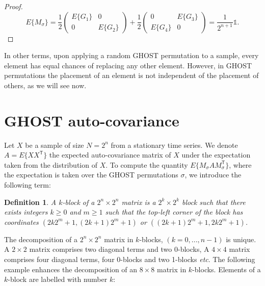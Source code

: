 \documentclass[12pt]{article}
\newtheorem{definition}{Definition}
\begin{document}
\begin{proof}
    \begin{equation*}
      E\{ M_\sigma \} = 
      \frac{1}{2} \left( \begin{array}{cc}
        E\{ G_1 \} & 0 \\
        0   & E \{ G_2 \}
      \end{array} \right) +
      \frac{1}{2} \left( \begin{array}{cc}
        0 & E \{ G_3 \} \\
        E \{ G_4 \} & 0
      \end{array} \right) = \frac{1}{2^{n+1}} \mathbb{1}.
    \end{equation*}

  \end{proof}

  In other terms, upon applying a random GHOST permutation to a
  sample, every element has equal chances of replacing any other
  element. However, in GHOST permutations the placement of an element
  is not independent of the placement of others, as we will see now.

  \section{GHOST auto-covariance}

  Let $X$ be a sample of size $N = 2^n$ from a stationary time series.
  We denote $A = E\{XX^\mathsf{T}\}$ the expected auto-covariance matrix
  of $X$ under the expectation taken from the distribution of $X$.
  To compute the quantity $E\{M_\sigma A M_\sigma^\mathsf{T}\}$,
  where the expectation is taken over the GHOST permutations
  $\sigma$, we introduce the following term:

  \begin{definition}\label{kblocks}
    A $k$-block of a $2^n \times 2^n$ matrix is a $2^k \times 2^k$ block
    such that there exists integers $k \geq0$ and $m \geq 1$ such that
    the top-left corner of the block has coordinates
    $(2k2^m+1, (2k+1)2^m+1)$ or $((2k+1)2^m+1, 2k2^m+1)$.
  \end{definition}

  The decomposition of a  $2^n \times 2^n$ matrix in
  $k$-blocks, $(k=0, ..., n-1)$ is unique. A $2 \times 2$ matrix
  comprises two diagonal terms and two 0-blocks, A $4 \times 4$ matrix
  comprises four diagonal terms, four 0-blocks and two 1-blocks
  \textit{etc}. The following example enhances the decomposition
  of an $8 \times 8$ matrix in $k$-blocks. Elements of a $k$-block
  are labelled with number $k$:
\end{document}
